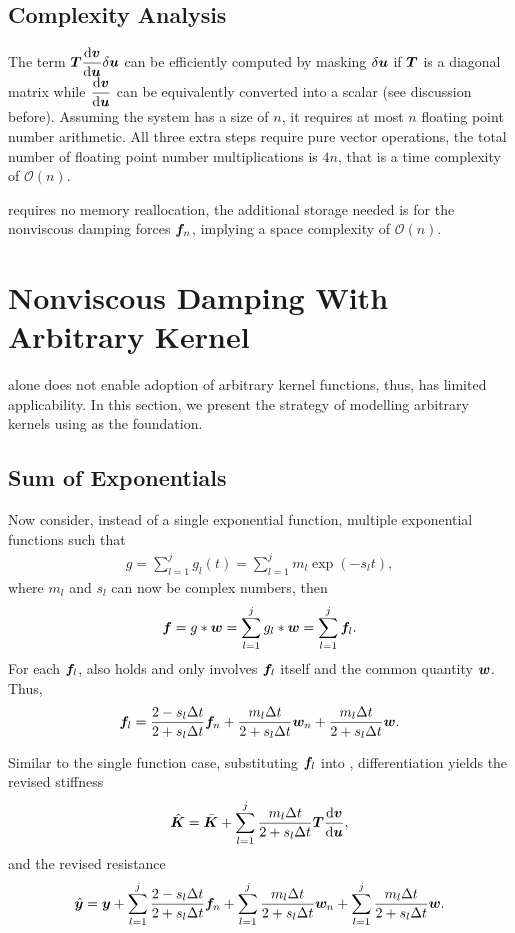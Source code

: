 \subsection{Complexity Analysis}
The term $\bm{T}\dfrac{\mathrm{d}\bm{v}}{\mathrm{d}\bm{u}}\delta\bm{u}$ can be efficiently computed by masking $\delta\bm{u}$ if $\bm{T}$ is a diagonal matrix while $\dfrac{\mathrm{d}\bm{v}}{\mathrm{d}\bm{u}}$ can be equivalently converted into a scalar (see discussion before). Assuming the system has a size of $n$, it requires at most $n$ floating point number arithmetic. All three extra steps require pure vector operations, the total number of floating point number multiplications is $4n$, that is a time complexity of $\mathcal{O}\left(n\right)$.

 requires no memory reallocation, the additional storage needed is for the nonviscous damping forces $\bm{f}_n$, implying a space complexity of $\mathcal{O}\left(n\right)$.
\section{Nonviscous Damping With Arbitrary Kernel}
 alone does not enable adoption of arbitrary kernel functions, thus, has limited applicability. In this section, we present the strategy of modelling arbitrary kernels using  as the foundation.
\subsection{Sum of Exponentials}
Now consider, instead of a single exponential function, multiple exponential functions such that
\begin{gather}\label{eq:sum_exp}
g=\sum_{l=1}^{j}g_l\left(t\right)=\sum_{l=1}^{j}m_l\exp\left(-s_lt\right),
\end{gather}
where $m_l$ and $s_l$ can now be complex numbers, then
\begin{gather}\label{eq:sum_conv}
\bm{f}=g*\bm{w}=\sum_{l=1}^{j}g_l*\bm{w}=\sum_{l=1}^{j}\bm{f}_l.
\end{gather}
For each $\bm{f}_l$,  also holds and only involves $\bm{f}_l$ itself and the common quantity $\bm{w}$. Thus,
\begin{gather}
\bm{f}_l=\dfrac{2-s_l\Delta{}t}{2+s_l\Delta{}t}\bm{f}_n+\dfrac{m_l\Delta{}t}{2+s_l\Delta{}t}\bm{w}_n+\dfrac{m_l\Delta{}t}{2+s_l\Delta{}t}\bm{w}.
\end{gather}

Similar to the single function case, substituting $\bm{f}_l$ into , differentiation yields the revised stiffness
\begin{gather}\label{eq:revised_k_multi}
\hat{\bm{K}}=\bar{\bm{K}}+\sum_{l=1}^{j}\dfrac{m_l\Delta{}t}{2+s_l\Delta{}t}\bm{T}\dfrac{\mathrm{d}\bm{v}}{\mathrm{d}\bm{u}},
\end{gather}
and the revised resistance
\begin{gather}\label{eq:revised_y_multi}
\hat{\bm{y}}=\bm{y}+\sum_{l=1}^{j}\dfrac{2-s_l\Delta{}t}{2+s_l\Delta{}t}\bm{f}_n+\sum_{l=1}^{j}\dfrac{m_l\Delta{}t}{2+s_l\Delta{}t}\bm{w}_n+\sum_{l=1}^{j}\dfrac{m_l\Delta{}t}{2+s_l\Delta{}t}\bm{w}.
\end{gather}

